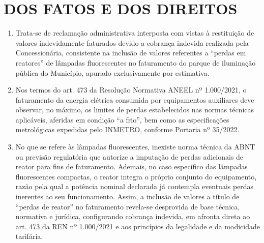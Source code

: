 \newcommand{\tipoRequerimento}{cobrança indevida por perda nos reatores de lâmpadas}

\newif\ifperdaVapor
\perdaVaporfalse

\newif\ifperdaFluorescente
\perdaFluorescentetrue

\section{DOS FATOS E DOS DIREITOS}

\begin{enumerate}[resume]
\item 
Trata-se de reclamação administrativa interposta com vistas à restituição de valores indevidamente faturados devido a cobrança indevida realizada pela Concessionária, consistente na inclusão de valores referentes a “perdas em reatores” de lâmpadas fluorescentes no faturamento do parque de iluminação pública do Município, apurado exclusivamente por estimativa.

\item 
Nos termos do art. 473 da Resolução Normativa ANEEL nº 1.000/2021, o faturamento da energia elétrica consumida por equipamentos auxiliares deve observar, no máximo, os limites de perdas estabelecidos nas normas técnicas aplicáveis, aferidas em condição “a frio”, bem como as especificações metrológicas expedidas pelo INMETRO, conforme Portaria nº 35/2022.

\ifperdaVapor
\item %
Para os reatores de lâmpadas , os limites máximos admissíveis de perdas devem observar as normas técnicas aplicáveis da ABNT, as quais possuem caráter vinculante e de observância obrigatória pela Concessionária.
\fi

\ifperdaFluorescente
\item %
No que se refere às lâmpadas fluorescentes, inexiste norma técnica da ABNT ou previsão regulatória que autorize a imputação de perdas adicionais de reator para fins de faturamento. Ademais, no caso específico das lâmpadas fluorescentes compactas, o reator integra o próprio conjunto do equipamento, razão pela qual a potência nominal declarada já contempla eventuais perdas inerentes ao seu funcionamento. Assim, a inclusão de valores a título de “perdas de reator” no faturamento revela-se desprovida de base técnica, normativa e jurídica, configurando cobrança indevida, em afronta direta ao art. 473 da REN nº 1.000/2021 e aos princípios da legalidade e da modicidade tarifária. 
\fi


\end{enumerate}

